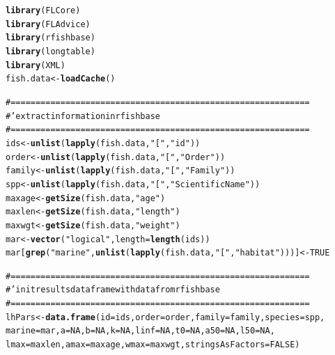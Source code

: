 \documentclass[a4paper]{article}\usepackage{graphicx, color}
\makeatletter
\newcommand{\hlfunctioncall}[1]{\textcolor[rgb]{0.501960784313725,0,0.329411764705882}{\textbf{#1}}}%
\newcommand{\hlstring}[1]{\textcolor[rgb]{0.6,0.6,1}{#1}}%
\newcommand{\hlcomment}[1]{\textcolor[rgb]{0.180392156862745,0.6,0.341176470588235}{#1}}%
\newenvironment{kframe}{%
 \def\at@end@of@kframe{}%
 \ifinner\ifhmode%
  \def\at@end@of@kframe{\end{minipage}}%
  \begin{minipage}{\columnwidth}%
 \fi\fi%
 \def\FrameCommand##1{\hskip\@totalleftmargin \hskip-\fboxsep
 \colorbox{shadecolor}{##1}\hskip-\fboxsep
     \hskip-\linewidth \hskip-\@totalleftmargin \hskip\columnwidth}%
 \MakeFramed {\advance\hsize-\width
   \@totalleftmargin\z@ \linewidth\hsize
   \@setminipage}}%
 {\par\unskip\endMakeFramed%
 \at@end@of@kframe}
\newenvironment{knitrout}{}{} %
\makeatother
\begin{document}
\begin{knitrout}
\color{fgcolor}\begin{kframe}
\begin{alltt}
\hlfunctioncall{library}(FLCore)
\hlfunctioncall{library}(FLAdvice)
\hlfunctioncall{library}(rfishbase)
\hlfunctioncall{library}(longtable)
\hlfunctioncall{library}(XML)
fish.data <- \hlfunctioncall{loadCache}()

\hlcomment{# ============================================================}
\hlcomment{#' extract information in rfishbase}
\hlcomment{# ============================================================}
ids <- \hlfunctioncall{unlist}(\hlfunctioncall{lapply}(fish.data, \hlstring{"["}, \hlstring{"id"}))
order <- \hlfunctioncall{unlist}(\hlfunctioncall{lapply}(fish.data, \hlstring{"["}, \hlstring{"Order"}))
family <- \hlfunctioncall{unlist}(\hlfunctioncall{lapply}(fish.data, \hlstring{"["}, \hlstring{"Family"}))
spp <- \hlfunctioncall{unlist}(\hlfunctioncall{lapply}(fish.data, \hlstring{"["}, \hlstring{"ScientificName"}))
maxage <- \hlfunctioncall{getSize}(fish.data, \hlstring{"age"})
maxlen <- \hlfunctioncall{getSize}(fish.data, \hlstring{"length"})
maxwgt <- \hlfunctioncall{getSize}(fish.data, \hlstring{"weight"})
mar <- \hlfunctioncall{vector}(\hlstring{"logical"}, length = \hlfunctioncall{length}(ids))
mar[\hlfunctioncall{grep}(\hlstring{"marine"}, \hlfunctioncall{unlist}(\hlfunctioncall{lapply}(fish.data, \hlstring{"["}, \hlstring{"habitat"})))] <- TRUE

\hlcomment{# ============================================================}
\hlcomment{#' init results dataframe with data from rfishbase}
\hlcomment{# ============================================================}
lhPars <- \hlfunctioncall{data.frame}(id = ids, order = order, family = family, species = spp, 
    marine = mar, a = NA, b = NA, k = NA, linf = NA, t0 = NA, a50 = NA, l50 = NA, 
    lmax = maxlen, amax = maxage, wmax = maxwgt, stringsAsFactors = FALSE)


\end{alltt}
\end{kframe}
\end{knitrout}
\end{document}
